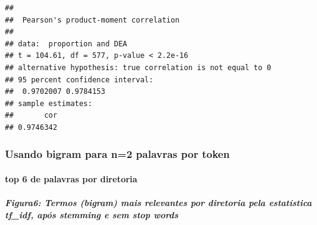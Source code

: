 \documentclass[]{article}
\newenvironment{Shaded}{\begin{snugshade}}{\end{snugshade}}
\newcommand{\KeywordTok}[1]{\textcolor[rgb]{0.13,0.29,0.53}{\textbf{#1}}}
\newcommand{\DataTypeTok}[1]{\textcolor[rgb]{0.13,0.29,0.53}{#1}}
\newcommand{\StringTok}[1]{\textcolor[rgb]{0.31,0.60,0.02}{#1}}
\newcommand{\OperatorTok}[1]{\textcolor[rgb]{0.81,0.36,0.00}{\textbf{#1}}}
\newcommand{\NormalTok}[1]{#1}
\let\oldparagraph\paragraph
\renewcommand{\paragraph}[1]{\oldparagraph{#1}\mbox{}}
\let\oldsubparagraph\subparagraph
\renewcommand{\subparagraph}[1]{\oldsubparagraph{#1}\mbox{}}
\begin{document}
\begin{Shaded}
\end{Shaded}

\begin{verbatim}
## 
##  Pearson's product-moment correlation
## 
## data:  proportion and DEA
## t = 104.61, df = 577, p-value < 2.2e-16
## alternative hypothesis: true correlation is not equal to 0
## 95 percent confidence interval:
##  0.9702007 0.9784153
## sample estimates:
##       cor 
## 0.9746342
\end{verbatim}

\subsubsection{Usando bigram para n=2 palavras por
token}\label{usando-bigram-para-n2-palavras-por-token}

\paragraph{top 6 de palavras por
diretoria}\label{top-6-de-palavras-por-diretoria}

\subparagraph{\texorpdfstring{Figura6: Termos (\textbf{bigram}) mais
relevantes por diretoria pela estatística \textbf{tf\_idf}, após
\textbf{stemming} e sem \textbf{stop
words}}{Figura6: Termos (bigram) mais relevantes por diretoria pela estatística tf\_idf, após stemming e sem stop words}}\label{figura6-termos-bigram-mais-relevantes-por-diretoria-pela-estatistica-tf_idf-apos-stemming-e-sem-stop-words}
\end{document}
